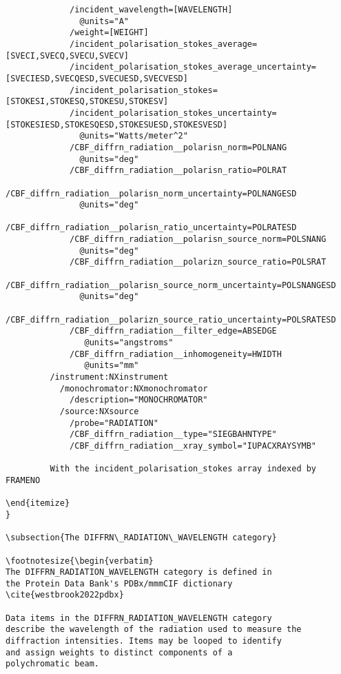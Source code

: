 \documentclass[11pt]{article}
\begin{document}
{{{\begin{verbatim}
             /incident_wavelength=[WAVELENGTH]
               @units="A"
             /weight=[WEIGHT]
             /incident_polarisation_stokes_average=[SVECI,SVECQ,SVECU,SVECV]
             /incident_polarisation_stokes_average_uncertainty=[SVECIESD,SVECQESD,SVECUESD,SVECVESD]
             /incident_polarisation_stokes=[STOKESI,STOKESQ,STOKESU,STOKESV]
             /incident_polarisation_stokes_uncertainty=[STOKESIESD,STOKESQESD,STOKESUESD,STOKESVESD]
               @units="Watts/meter^2"
             /CBF_diffrn_radiation__polarisn_norm=POLNANG
               @units="deg"
             /CBF_diffrn_radiation__polarisn_ratio=POLRAT
             /CBF_diffrn_radiation__polarisn_norm_uncertainty=POLNANGESD
               @units="deg"
             /CBF_diffrn_radiation__polarisn_ratio_uncertainty=POLRATESD
             /CBF_diffrn_radiation__polarisn_source_norm=POLSNANG
               @units="deg"
             /CBF_diffrn_radiation__polarizn_source_ratio=POLSRAT
             /CBF_diffrn_radiation__polarisn_source_norm_uncertainty=POLSNANGESD
               @units="deg"
             /CBF_diffrn_radiation__polarizn_source_ratio_uncertainty=POLSRATESD
             /CBF_diffrn_radiation__filter_edge=ABSEDGE
                @units="angstroms"
             /CBF_diffrn_radiation__inhomogeneity=HWIDTH
                @units="mm"
         /instrument:NXinstrument
           /monochromator:NXmonochromator
             /description="MONOCHROMATOR"
           /source:NXsource
             /probe="RADIATION"
             /CBF_diffrn_radiation__type="SIEGBAHNTYPE"
             /CBF_diffrn_radiation__xray_symbol="IUPACXRAYSYMB"

         With the incident_polarisation_stokes array indexed by FRAMENO

\end{itemize}
}

\subsection{The DIFFRN\_RADIATION\_WAVELENGTH category}

\footnotesize{\begin{verbatim}
The DIFFRN_RADIATION_WAVELENGTH category is defined in
the Protein Data Bank's PDBx/mmmCIF dictionary
\cite{westbrook2022pdbx}
    
Data items in the DIFFRN_RADIATION_WAVELENGTH category
describe the wavelength of the radiation used to measure the
diffraction intensities. Items may be looped to identify
and assign weights to distinct components of a
polychromatic beam.


\end{verbatim}}}}
\end{document}
